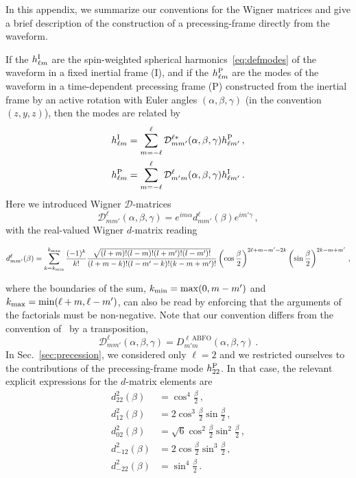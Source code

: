 \documentclass[aps,showpacs,twocolumn,
prd,superscriptaddress,nofootinbib]{revtex4-1}
\newcommand{\be}{\begin{equation}}
\newcommand{\ee}{\end{equation}}
\newcommand\calD{{\mathcal{D}}}
\newcommand{\jgb}[1]{{\color{DarkGreen} #1}}
\begin{document}
In this appendix, we summarize our conventions for the Wigner matrices and give a brief description of the construction of a precessing-frame directly from the waveform.

If the $h_{\ell m}^{\rm I}$ are the spin-weighted spherical harmonics~\eqref{eq:defmodes} of the waveform in a fixed inertial frame (I), and if the $h_{\ell m}^{\rm P}$ are the modes of the waveform in a time-dependent precessing frame (P) constructed from the inertial frame by an active rotation with Euler angles $(\alpha, \beta, \gamma)$ (in the convention $(z,y,z)$), then the modes are related by
\begin{subequations}
\label{eq:wignerrotApp}
\begin{align}
	h_{\ell m}^{\rm I} = \sum\limits_{m=-\ell}^{\ell} \calD^{\ell *}_{mm'} (\alpha,\beta,\gamma) h_{\ell m'}^{\rm P} \,, \\
	h_{\ell m}^{\rm P} = \sum\limits_{m=-\ell}^{\ell} \calD^{\ell }_{m'm} (\alpha,\beta,\gamma) h_{\ell m'}^{\rm I} \,.
\end{align}
\end{subequations}
Here we introduced Wigner $\calD$-matrices
\be\label{eq:defWignerDapp}
	\calD^{\ell}_{mm'} (\alpha, \beta, \gamma) = e^{im \alpha} d^{\ell}_{mm'}(\beta) e^{im' \gamma}\,,
\ee
with the real-valued Wigner $d$-matrix reading
\begin{widetext}
\be\label{eq:defWignerdapp}
	d^{\ell}_{mm'}(\beta) = \sum\limits_{k=k_{\rm min}}^{k_{\rm max}} \frac{(-1)^{k}}{k!} \frac{\sqrt{(l+m)! (l-m)! (l+m')! (l-m')!}}{(l+m-k)! (l-m'-k)! (k-m+m')!} \left( \cos\frac{\beta}{2} \right)^{2\ell+m-m'-2k} \left( \sin\frac{\beta}{2} \right)^{2k-m+m'}\,,
\ee
\end{widetext}
where the boundaries of the sum, $k_{\rm min} = \mathrm{max}(0, m-m')$ and $k_{\rm max} = \mathrm{min}(\ell+m, \ell-m')$, can also be read by enforcing that the arguments of the factorials must be non-negative. Note that our convention differs from the convention of~\cite{ABFO09} by a transposition,
\be
	\calD^{\ell}_{m m'} (\alpha, \beta, \gamma) = D^{\ell \, \mathrm{ABFO}}_{m' m} (\alpha, \beta, \gamma) \,.
\ee
In Sec.~\ref{sec:precession}, we considered only $\ell = 2$ and we restricted ourselves to the contributions of the precessing-frame mode $h_{22}^{\rm P}$. In that case, the relevant explicit \jgb{expressions for the $d$-matrix elements} are
\begin{subequations}
\begin{align}
	d^{2}_{22} (\beta) &= \cos^{4} \frac{\beta}{2}\,, \\
	d^{2}_{12} (\beta) &= 2 \cos^{3} \frac{\beta}{2} \sin \frac{\beta}{2}\,, \\
	d^{2}_{02} (\beta) &= \sqrt{6} \cos^{2} \frac{\beta}{2} \sin^{2} \frac{\beta}{2} \,, \\
	d^{2}_{-12} (\beta) &= 2 \cos \frac{\beta}{2} \sin^{3} \frac{\beta}{2} \,, \\
	d^{2}_{-22} (\beta) &= \sin^{4} \frac{\beta}{2} \,.
\end{align}
\end{subequations}
\end{document}
